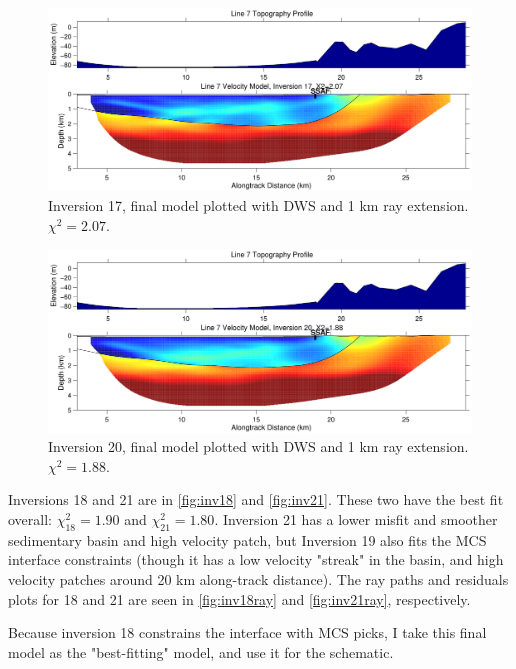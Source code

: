 \documentclass[fontsize=11pt, %
                             paper=a4, %
                             twoside, %
                             captions=tableheading,
                             index=totoc,
                             hyperref]{labbook}
\begin{document}
\begin{addmargin}[4cm]{0cm}
\begin{figure}[h!]
\raggedleft
\includegraphics[scale=0.6,keepaspectratio=true]{figs/interface_figures/inv17.pdf}
\caption{Inversion 17, final model plotted with DWS and 1 km ray extension.  $\chi^2 = 2.07$.}
\label{fig:inv17}
\end{figure} 

\begin{figure}[h!]
\raggedleft
\includegraphics[scale=0.6,keepaspectratio=true]{figs/interface_figures/inv20.pdf}
\caption{Inversion 20, final model plotted with DWS and 1 km ray extension.  $\chi^2 = 1.88$.}
\label{fig:inv20}
\end{figure} 
 
 Inversions 18 and 21 are in \autoref{fig:inv18} and \autoref{fig:inv21}.  These two have the best fit overall: $\chi^2_{18} = 1.90$ and $\chi^2_{21} = 1.80$.  Inversion 21 has a lower misfit and smoother sedimentary basin and high velocity patch, but Inversion 19 also fits the MCS interface constraints (though it has a low velocity "streak" in the basin, and high velocity patches around 20 km along-track distance).  The ray paths and residuals plots for 18 and 21 are seen in \autoref{fig:inv18ray} and \autoref{fig:inv21ray}, respectively. 
 
Because inversion 18 constrains the interface with MCS picks, I take this final model as the "best-fitting" model, and use it for the schematic.  
 

\end{addmargin}
\end{document}
